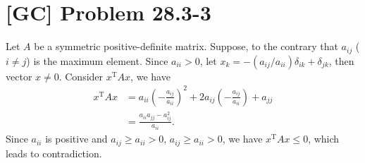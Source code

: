 \documentclass[a4paper,11pt]{article}
\begin{document}
  \section{[GC] Problem 28.3-3}
  Let $A$ be a symmetric positive-definite matrix. Suppose, to the contrary that $a_{ij}$ ($i \neq j$) is the maximum element. Since $a_{ii} > 0$, let $x_k = -(a_{ij}/a_{ii})\delta_{ik} + \delta_{jk}$, then vector $x \neq 0$. Consider $x^{\text{T}}Ax$, we have
  \begin{align*}
    x^{\text{T}}Ax &= a_{ii}\left(-\frac{a_{ij}}{a_{ii}}\right)^2 + 2a_{ij}\left(-\frac{a_{ij}}{a_{ii}}\right) + a_{jj} \\
    &= \frac{a_{ii}a_{jj}-a_{ij}^2}{a_{ii}}.
  \end{align*}
  Since $a_{ii}$ is positive and $a_{ij} \geq a_{ii} > 0$, $a_{ij} \geq a_{ii} > 0$, we have $x^{\text{T}}Ax \leq 0$, which leads to contradiction.
\end{document}
